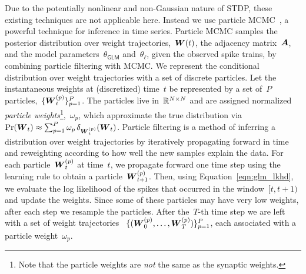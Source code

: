 Due to the potentially nonlinear and non-Gaussian nature of STDP, these existing techniques are not applicable here. Instead we use particle MCMC~\cite{Andrieu-2010}, a powerful technique for inference in time series. Particle MCMC samples the posterior distribution over weight trajectories,~$\boldsymbol{W}(t)$, the adjacency matrix~$\boldsymbol{A}$, and the model parameters~$\theta_{\mathsf{GLM}}$ and~$\theta_\ell$, given the observed spike trains, by combining particle filtering with MCMC.  We represent the conditional distribution over weight trajectories with a set of discrete particles.  Let the instantaneous weights at (discretized) time~$t$ be represented by a set of~$P$ particles,~${\{\boldsymbol{W}_{t}^{(p)}\}_{p=1}^P}$. The particles live in~$\mathbb{R}^{N \times N}$ and are assigned normalized \emph{particle weights}\footnote{Note that the particle weights are \emph{not} the same as the synaptic weights.},~$\omega_p$, which approximate the true distribution via~${\Pr(\boldsymbol{W}_{t}) \approx \sum_{p=1}^P \omega_p \, \delta_{\boldsymbol{W}_{t}^{(p)}} (\boldsymbol{W}_{t})}$.
Particle filtering is a method of inferring a distribution over weight trajectories
by iteratively propagating forward in time and reweighting according to how well the new samples explain the data.
For each particle~${\boldsymbol{W}_{t}^{(p)}}$ at time~$t$, we propagate forward one time step using the learning rule to obtain a particle~${\boldsymbol{W}_{t+1}^{(p)}}$. 
Then, using Equation~\ref{eqn:glm_lkhd}, we evaluate the log likelihood of the spikes that occurred in the window~${[t,t+1)}$ and update the weights.
Since some of these particles may have very low weights, after each step we resample the particles. After the~$T$-th time step we are left with a set of weight trajectories ~${\{(\boldsymbol{W}_0^{(p)},\ldots,\boldsymbol{W}_{T}^{(p)})\}_{p=1}^P}$, each associated with a particle weight~$\omega_p$.


